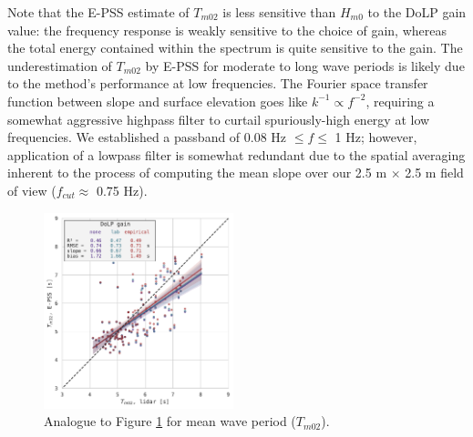 \documentclass[letterpaper,journal]{IEEEtran}
\begin{document}
Note that the E-PSS estimate of $T_{m02}$ is less sensitive than $H_{m0}$ to the DoLP gain value: the frequency response is weakly sensitive to the choice of gain, whereas the total energy contained within the spectrum is quite sensitive to the gain. The underestimation of $T_{m02}$ by E-PSS for moderate to long wave periods is likely due to the method's performance at low frequencies. The Fourier space transfer function between slope and surface elevation goes like $k^{-1}\propto f^{-2}$, requiring a somewhat aggressive highpass filter to curtail spuriously-high energy at low frequencies. We established a passband of 0.08 Hz $\le f \le$ 1 Hz; however, application of a lowpass filter is somewhat redundant due to the spatial averaging inherent to the process of computing the mean slope over our 2.5 m $\times$ 2.5 m field of view ($f_{cut}\approx$ 0.75 Hz).

\begin{figure}[!ht]
    \centering
    \includegraphics[width=0.49\textwidth]{_figures/Tm02_comparison_lidar_epss.pdf}
    \vspace{-20pt}
    \caption{Analogue to Figure \ref{fig:Tm02_comparison_lidar_epss} for mean wave period ($T_{m02}$).}
    \label{fig:Tm02_comparison_lidar_epss}
\end{figure}

\newpage
\end{document}
